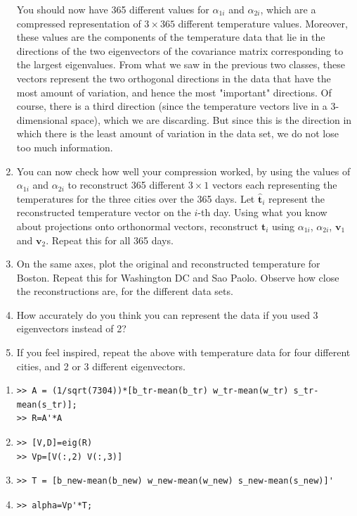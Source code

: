 \begin{prob}
\begin{enumerate}
    You should now have 365 different values for $\alpha_{1i}$ and $\alpha_{2i}$, which are a compressed representation of  $3\times 365$ different temperature values.  Moreover, these values are the components of the temperature data that lie in the directions of the two eigenvectors of the covariance matrix corresponding to the largest eigenvalues. From what we saw in the previous two classes, these vectors represent the two orthogonal directions in the data that have the most amount of variation, and hence the most "important" directions. Of course, there is a third direction (since the temperature vectors live in a 3-dimensional space), which we are discarding.  But since this is the direction  in which there is the least amount of variation in the data set, we do not lose too much information.

\item You can now check how well your compression worked, by using the values of $\alpha_{1i}$ and $\alpha_{2i}$ to reconstruct 365 different $3\times 1$ vectors each representing the temperatures for the three cities over the 365 days. Let $\hat{\mathbf{t}}_i$ represent the reconstructed temperature vector on the $i$-th day. Using what you know about  projections onto orthonormal vectors, reconstruct $\mathbf{t}_i$ using $\alpha_{1i}$, $\alpha_{2i}$, $\mathbf{v}_1$ and $\mathbf{v}_2$. Repeat this for all 365 days.

\item On the same axes, plot the original and reconstructed temperature for Boston. Repeat this for Washington DC and Sao Paolo. Observe how close the reconstructions are, for the different data sets.

\item How accurately do you think you can represent the data if you used 3 eigenvectors instead of 2?

\item If you feel inspired, repeat the above with temperature data for four different cities, and 2 or 3 different eigenvectors.

\end{enumerate}
\end{prob}
\begin{sol}
\begin{enumerate}
    \item \begin{verbatim}
>> A = (1/sqrt(7304))*[b_tr-mean(b_tr) w_tr-mean(w_tr) s_tr-mean(s_tr)];
>> R=A'*A
    \end{verbatim}
    \item \begin{verbatim}
>> [V,D]=eig(R)
>> Vp=[V(:,2) V(:,3)]
    \end{verbatim}
    \item \begin{verbatim}
>> T = [b_new-mean(b_new) w_new-mean(w_new) s_new-mean(s_new)]'
    \end{verbatim}
    \item \begin{verbatim}
>> alpha=Vp'*T;
    \end{verbatim}
\end{enumerate}
\end{sol}



